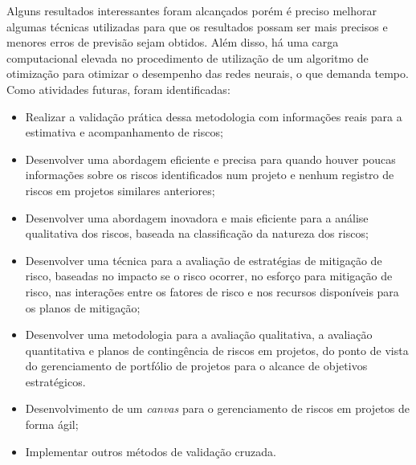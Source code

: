 Alguns resultados interessantes foram alcançados porém é preciso melhorar algumas técnicas utilizadas para que os resultados possam ser mais precisos e menores erros de previsão sejam obtidos. Além disso, há uma carga computacional elevada no procedimento de utilização de um algoritmo de otimização para otimizar o desempenho das redes neurais, o que demanda tempo. Como atividades futuras, foram identificadas:
\begin{itemize}
\item Realizar a validação prática dessa metodologia com informações reais para a estimativa e acompanhamento de riscos;
\item Desenvolver uma abordagem eficiente e precisa para quando houver poucas informações sobre os riscos identificados num projeto e nenhum registro de riscos em projetos similares anteriores;
\item Desenvolver uma abordagem inovadora e mais eficiente para a análise qualitativa dos riscos, baseada na classificação da natureza dos riscos;
\item Desenvolver uma técnica para a avaliação de estratégias de mitigação de risco, baseadas no impacto se o risco ocorrer, no esforço para mitigação de risco, nas interações entre os fatores de risco e nos recursos disponíveis para os planos de mitigação;
\item Desenvolver uma metodologia para a avaliação qualitativa, a avaliação quantitativa e planos de contingência de riscos em projetos, do ponto de vista do gerenciamento de portfólio de projetos para o alcance de objetivos estratégicos.
\item Desenvolvimento de um \textit{canvas} para o gerenciamento de riscos em projetos de forma ágil;
\item Implementar outros métodos de validação cruzada.
\end{itemize}

\pagebreak

